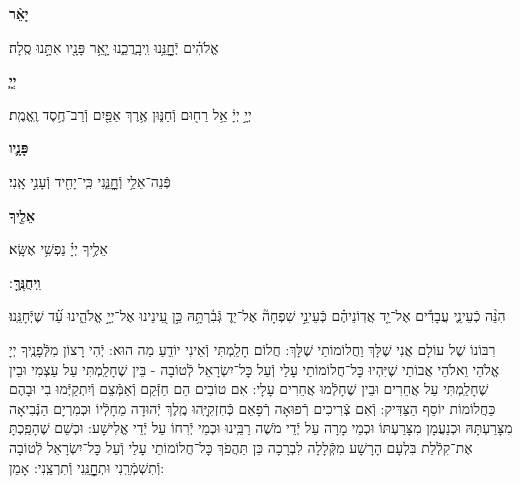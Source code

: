 \documentclass[twoside, openany, parskip=half, 11pt]{book}
\begin{document}
\textbf{יָאֵ֨ר}
\hfill \begin{footnotesize}
אֱלֹהִ֗ים יְֿחׇׇׇׇָנֵּ֥נוּ וִֽיבָֽרֲכֵ֑נוּ יָ֤אֵ֥ר פָּנָ֖יו אִתָּ֣נוּ סֶֽלָה׃\\
\end{footnotesize}
\textbf{יְיָ֧}
\hfill \begin{footnotesize}
יְיָ֣ יְיָ֔ אֵ֥ל רַח֖וּם וְֿחַנּ֑וּן אֶ֥רֶךְ אַפַּ֖יִם וְֿרַב־חֶ֥סֶד וֶֽאֱמֶֽת׃\\
\end{footnotesize}
\textbf{פָּנָ֛יו}
\hfill \begin{footnotesize}
פְּֿנֵה־אֵלַ֥י וְֿחׇׇׇׇׇָנֵּ֑נִי כִּֽי־יָחִ֖יד וְֿעָנִ֣י אָֽנִי׃\\
\end{footnotesize}
\textbf{אֵלֶ֖יךָ}
\hfill \begin{footnotesize}
אֵלֶ֥יךָ יְיָ֗ נַפְשִׁ֥י אֶשָּֽׂא׃\\
\end{footnotesize}
\textbf{וִֽיחֻנֶּֽךָּ}
׃ \hfill \begin{footnotesize}
הִנֵּ֨ה כְֿעֵינֵ֢י עֲבָדִ֡ים אֶל־יַ֤ד אֲדֽוֹנֵיהֶ֗ם כְּֿעֵינֵ֣י שִׁפְחָה֘ אֶל־יַד֢ גְּֿבִ֫רְתָּ֥הּ כֵּ֣ן עֵ֭ינֵינוּ אֶל־יְיָ֣ אֱלֹהֵ֑ינוּ עַ֝֗ד שֶׁיְּֿחָנֵּֽנוּ׃
\end{footnotesize}


רִבּוֹנוֹ שֶׁל עוֹלָם אֲנִי שֶׁלָּךְ וַחֲלוֹמוֹתַי שֶׁלָּךְ: חֲלוֹם חָלַֽמְתִּי וְֿאֵינִי יוֹדֵֽעַ מַה הוּא: יְֿהִי רָצוֹן מִלְּֿפָנֶֽיךָ יְיָ אֱלֹהַי וֵאלֹהֵי אֲבוֹתַי שֶׁיִּהְיוּ כׇּל־חֲלוֹמוֹתַי עָלַי וְֿעַל כׇּל־יִשְׂרָאֵל לְֿטוֹבָה - בֵּין שֶׁחָלַֽמְתִּי עַל עַצְמִי וּבֵין שֶׁחָלַֽמְתִּי עַל אֲחֵרִים וּבֵין שֶׁחָלְֿמוּ אֲחֵרִים עָלָי: אִם טוֹבִים הֵם חַזְּֿקֵם וְֿאַמְּֿצֵם וְֿיִתְקַיְּֿמוּ בִי וּבָהֶם כַּחֲלוֹמוֹת יוֹסֵף הַצַּדִּיק: וְֿאִם צְֿרִיכִים רְֿפוּאָה רְֿפָאֵם כְּֿחִזְקִיָּֽהוּ מֶֽלֶךְ יְֿהוּדָה מֵחָלְֿיוֹ וּכְמִרְיָם הַנְּֿבִיאָה מִצָּרַעְתָּהּ וּכְנַעֲמָן מִצָּרַעְתּוֹ וּכְמֵי מָרָה עַל יְֿדֵי מֹשֶׁה רַבֵּֽינוּ וּכְמֵי יְֿרִחוֹ עַל יְֿדֵי אֱלִישָׁע: וּכְשֵׁם שֶׁהָפַֽכְתָּ אֶת־קִלְֿלַת בִּלְעָם הָרָשָׁע מִקְּֿלָלָה לִבְרָכָה כֵּן תַּהֲפֹךְ כׇּל־חֲלוֹמוֹתַי עָלַי וְֿעַל כׇּל־יִשְׂרָאֵל לְֿטוֹבָה וְֿתִשְׁמְֿרֵֽנִי וּתְחׇׇׇׇׇָנֵּֽנִי וְֿתִרְצֵֽנִי: אָמֵן:
\end{document}
